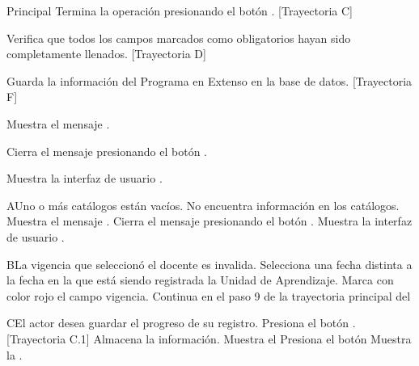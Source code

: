 \begin{UCtrayectoria}{Principal}
	\UCpaso[\UCactor] Termina la operación presionando el botón . [Trayectoria C]
        
    \UCpaso Verifica que todos los campos marcados como obligatorios hayan sido completamente llenados. [Trayectoria D]
    
    \UCpaso Guarda la información del Programa en Extenso en la base de datos. [Trayectoria F]
    
    \UCpaso Muestra el mensaje .
    
    \UCpaso[\UCactor] Cierra el mensaje presionando el botón .
    
    \UCpaso Muestra la interfaz de usuario .
\end{UCtrayectoria}


\begin{UCtrayectoriaA}{A}{Uno o más catálogos están vacíos.}
	\UCpaso No encuentra información en los catálogos.
    \UCpaso Muestra el mensaje .
    \UCpaso[\UCactor] Cierra el mensaje presionando el botón .
	\UCpaso Muestra la interfaz de usuario .
\end{UCtrayectoriaA}


\begin{UCtrayectoriaA}{B}{La vigencia que seleccionó el docente es invalida.}
	\UCpaso[\UCactor] Selecciona una fecha distinta a la fecha en la que está siendo registrada la Unidad de Aprendizaje.
	\UCpaso Marca con color rojo el campo vigencia.
	\UCpaso Continua en el paso 9 de la trayectoria principal del 
\end{UCtrayectoriaA}


\begin{UCtrayectoriaA}{C}{El actor desea guardar el progreso de su registro.}
\UCpaso[\UCactor] Presiona el botón . [Trayectoria C.1]
\UCpaso Almacena la información.
\UCpaso Muestra el 
\UCpaso[\UCactor] Presiona el botón  
\UCpaso Muestra la .
\end{UCtrayectoriaA}

